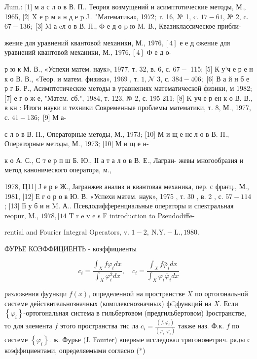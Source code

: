 \documentclass[10pt]{article}
\begin{document}
Лum.: [1] м а с л о в В. П.. Теория возмущений и асимптотические методы, М., 1965, [2] X е p м а н д е p Ј.. "Математика», 1972; т. 16, № 1, с. $17-61$, № 2, c. $67-136 ;$ [3] M а cл о в В. П., Ф е д о $\mathrm{p}$ ю $\mathrm{M}$. В., Квазиклассическое прибли-

жение для уравнений квантовой механики, М., $1976,[4]$ е е д ожение для уравнений квантовой механики, М., $1976,[4]$ Ф е д о-

р ю к М. В., «Успехи матем. наук», 1977, т. 32, в. 6, с. $67-$ 115; [5] К у'ч е р е н к о В. В., «Теор. и матем. физика», 1969 , т. $1, \mathcal{N}$ 3, с. $384-406 ;$ [6] В а й н б е р г Б. Р., Асимптотические методы в уравнениях математической физики, м 1982; [7] е г о ж е, "Матем. сб.", 1984, т. 123, № 2, с. 195-211; [8] K уч е р ен к о В. В., в кн : Итоги науки и техники Современные проблемы математики, т. 8, М., 1977, с. $41-136 ;$ [9] М а-

с л о в В. П., Операторные методы, М., 1973; [10] М и щ е нс л о в В. П., Операторные методы, М., 1973; [10] М и щ е н-

к о А. С., С т е р п ш Б. Ю., ІІ а т а л о в В. Е., Лагран- жевы многообразия и метод канонического оператора, м.,

1978, Ц11] Ј е р е Ж., Јагранжев анализ и квантовая механика, пер. с фрағц., М., 1981, [12] Е г о р о в Ю. В. «Успехи матем. наук», 1975 , т. 30 , в. 2 , с. $57-114$; [13] Iї у б и н M. А.. Псевдодифференциальные операторы и спектральная reopur, M., $1978,[14$ T r e v e s F introduction to Pseudodiffe-

rential and Fourier Integral Operators, v. $1-2, \mathrm{~N} . \mathrm{Y} .-\mathrm{L} ., 1980$.



ФУРЬЕ КОЭФФИЦИЕНТЬ - коэффициенты



\[

c_{i}=\frac{\int_{X} f \varphi_{i} d x}{\int_{X} \varphi_{i}^{2} d x}, \quad c_{i}=\frac{\int_{X} f \bar{\varphi}_{i} d x}{\int_{X} \varphi_{i} \bar{\varphi}_{i} d x}

\]



разложения фуункци $f(x)$, определенной на пространстве $X$ по ортогональной системе действительнозначных (комплекснозначных) ф্функций на $X$. Если $\left\{\varphi_{i}\right\}$-ортогональная система в гильбертовом (предгильбертовом) Іространстве, то для элемента $f$ этого пространства тис ла $c_{i}=\frac{\left(f, \varphi_{i}\right)}{\left(\varphi_{i}, \varphi_{i}\right)}$ также наз. Ф.к. $f$ по системе $\left\{\varphi_{i}\right\}$. ж. Фурье (Ј. Fourier) впервые исследовал тригонометрич. ряды с коэффициентами, определяемыми согласно (*)
\end{document}
